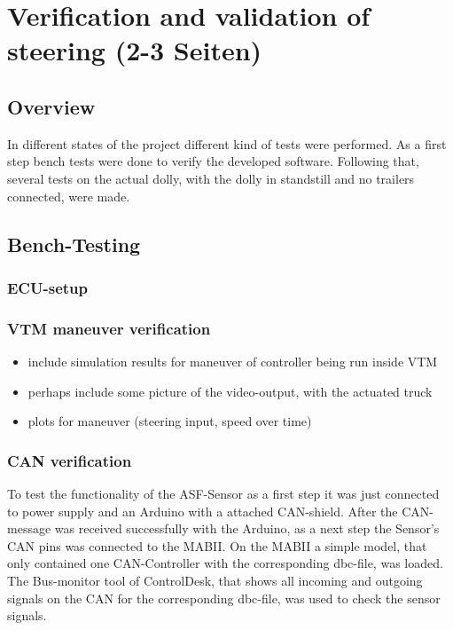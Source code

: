 \documentclass[ExampleMasters.tex]{subfiles}
\begin{document}
\clearpage
\chapter{Verification and validation of steering  (2-3 Seiten)}
\label{chap:testing}

\section{Overview}
In different states of the project different kind of tests were performed. As a first step bench tests were done to verify the developed software. Following that, several tests on the actual dolly, with the dolly in standstill and no trailers connected, were made.

\section{Bench-Testing}
\label{sec:bench-testing}
\subsection{ECU-setup}
\subsection{VTM maneuver verification}
\begin{itemize}
	\item include simulation results for maneuver of controller being run inside VTM
	\item perhaps include some picture of the video-output, with the actuated truck
	\item plots for maneuver (steering input, speed over time)
	
\end{itemize}
\subsection{CAN verification}
To test the functionality of the ASF-Sensor as a first step it was just connected to power supply and an Arduino with a attached CAN-shield. After the CAN-message was received successfully with the Arduino, as a next step the Sensor's CAN pins was connected to the MABII. On the MABII a simple model, that only contained one CAN-Controller with the corresponding dbc-file, was loaded. The Bus-monitor tool of ControlDesk, that shows all incoming and outgoing signals on the CAN for the corresponding dbc-file, was used to check the sensor signals.     
\end{document}

